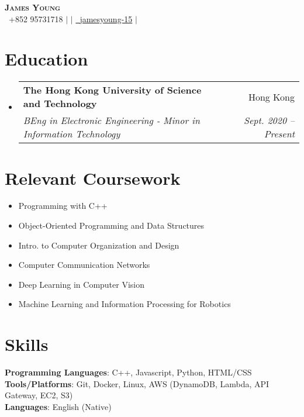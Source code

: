 \documentclass[letterpaper,12pt]{article}
\makeatletter
\newcommand{\resumeSubheading}[4]{
  \vspace{-2pt}\item
    \begin{tabular*}{0.97\textwidth}[t]{l@{\extracolsep{\fill}}r}
      \textbf{#1} & #2 \\
      \textit{\small#3} & \textit{\small #4} \\
    \end{tabular*}\vspace{-7pt}
}
\newcommand{\resumeSubHeadingListStart}{\begin{itemize}[leftmargin=0.05in, label={}]}
\newcommand{\resumeSubHeadingListEnd}{\end{itemize}}
\makeatother
\begin{document}
\begin{center}
    \textbf{\Huge \scshape James Young} \\ \vspace{2pt}
    \small  \faPhone\ {+852 95731718} $|$ 
    \href{mailto:jyyoungaa@connect.ust.hk}{} $|$ 
    \href{https://github.com/jamesyoung-15} {\faGithub\ {jamesyoung-15}} $|$
    \href{https://linkedin.com/in/jamesyyoung}{}
\end{center}


\section{Education}
  \resumeSubHeadingListStart
    \resumeSubheading
      {The Hong Kong University of Science and Technology}{Hong Kong}
      {BEng in Electronic Engineering - Minor in Information Technology}{Sept. 2020 -- Present}
  \resumeSubHeadingListEnd

\section{Relevant Coursework}
\vspace{-12pt}
    \begin{multicols}{2}
        \begin{itemize}[itemsep=-1pt, parsep=3pt]
        \small
            \item Programming with C++
            \item Object-Oriented Programming and Data Structures
            \item Intro. to Computer Organization and Design
            \item Computer Communication Networks
            \item Deep Learning in Computer Vision
            \item Machine Learning and Information Processing for Robotics
        \end{itemize}
    \end{multicols}

\vspace{-20pt}
\section{Skills}
 \begin{itemize}[leftmargin=0.15in, label={}]
    \small{\item{
     \textbf{Programming Languages}{: C++, Javascript, Python, HTML/CSS} \\
     \textbf{Tools/Platforms}{: Git, Docker, Linux, AWS (DynamoDB, Lambda, API Gateway, EC2, S3)} \\
     \textbf{Languages}{: English (Native)} \\
    }}
 \end{itemize}
\end{document}
